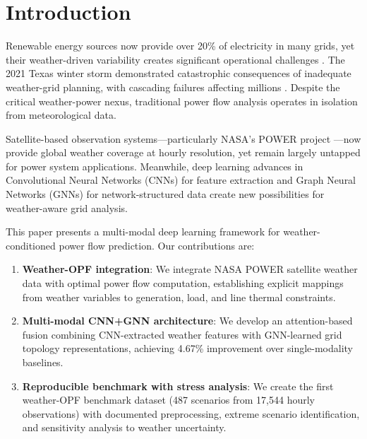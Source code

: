 \documentclass[journal,12pt,onecolumn]{IEEEtran}
\begin{document}
\section{Introduction}
\label{sec:introduction}

Renewable energy sources now provide over 20\% of electricity in many grids, yet their weather-driven variability creates significant operational challenges \cite{ref1}. The 2021 Texas winter storm demonstrated catastrophic consequences of inadequate weather-grid planning, with cascading failures affecting millions \cite{ref2}. Despite the critical weather-power nexus, traditional power flow analysis operates in isolation from meteorological data.

Satellite-based observation systems—particularly NASA's POWER project \cite{ref4}—now provide global weather coverage at hourly resolution, yet remain largely untapped for power system applications. Meanwhile, deep learning advances in Convolutional Neural Networks (CNNs) for feature extraction \cite{ref6} and Graph Neural Networks (GNNs) for network-structured data \cite{ref7} create new possibilities for weather-aware grid analysis.

This paper presents a multi-modal deep learning framework for weather-conditioned power flow prediction. Our contributions are:

\begin{enumerate}
    \item \textbf{Weather-OPF integration}: We integrate NASA POWER satellite weather data with optimal power flow computation, establishing explicit mappings from weather variables to generation, load, and line thermal constraints.
    
    \item \textbf{Multi-modal CNN+GNN architecture}: We develop an attention-based fusion combining CNN-extracted weather features with GNN-learned grid topology representations, achieving 4.67\% improvement over single-modality baselines.
    
    \item \textbf{Reproducible benchmark with stress analysis}: We create the first weather-OPF benchmark dataset (487 scenarios from 17,544 hourly observations) with documented preprocessing, extreme scenario identification, and sensitivity analysis to weather uncertainty.
\end{enumerate}
\end{document}
